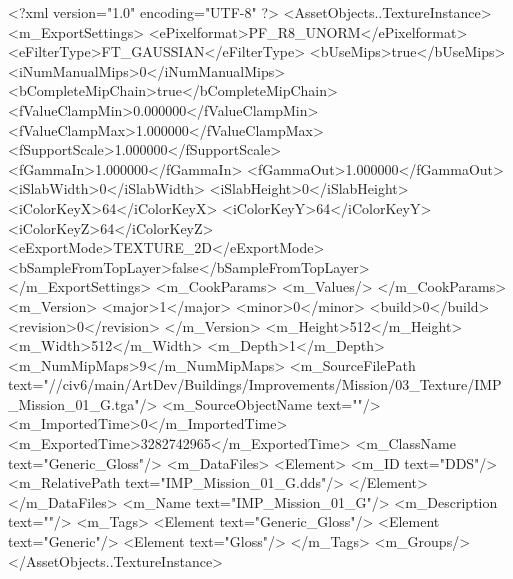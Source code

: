 <?xml version="1.0" encoding="UTF-8" ?>
<AssetObjects..TextureInstance>
	<m_ExportSettings>
		<ePixelformat>PF_R8_UNORM</ePixelformat>
		<eFilterType>FT_GAUSSIAN</eFilterType>
		<bUseMips>true</bUseMips>
		<iNumManualMips>0</iNumManualMips>
		<bCompleteMipChain>true</bCompleteMipChain>
		<fValueClampMin>0.000000</fValueClampMin>
		<fValueClampMax>1.000000</fValueClampMax>
		<fSupportScale>1.000000</fSupportScale>
		<fGammaIn>1.000000</fGammaIn>
		<fGammaOut>1.000000</fGammaOut>
		<iSlabWidth>0</iSlabWidth>
		<iSlabHeight>0</iSlabHeight>
		<iColorKeyX>64</iColorKeyX>
		<iColorKeyY>64</iColorKeyY>
		<iColorKeyZ>64</iColorKeyZ>
		<eExportMode>TEXTURE_2D</eExportMode>
		<bSampleFromTopLayer>false</bSampleFromTopLayer>
	</m_ExportSettings>
	<m_CookParams>
		<m_Values/>
	</m_CookParams>
	<m_Version>
		<major>1</major>
		<minor>0</minor>
		<build>0</build>
		<revision>0</revision>
	</m_Version>
	<m_Height>512</m_Height>
	<m_Width>512</m_Width>
	<m_Depth>1</m_Depth>
	<m_NumMipMaps>9</m_NumMipMaps>
	<m_SourceFilePath text="//civ6/main/ArtDev/Buildings/Improvements/Mission/03_Texture/IMP_Mission_01_G.tga"/>
	<m_SourceObjectName text=""/>
	<m_ImportedTime>0</m_ImportedTime>
	<m_ExportedTime>3282742965</m_ExportedTime>
	<m_ClassName text="Generic_Gloss"/>
	<m_DataFiles>
		<Element>
			<m_ID text="DDS"/>
			<m_RelativePath text="IMP_Mission_01_G.dds"/>
		</Element>
	</m_DataFiles>
	<m_Name text="IMP_Mission_01_G"/>
	<m_Description text=""/>
	<m_Tags>
		<Element text="Generic_Gloss"/>
		<Element text="Generic"/>
		<Element text="Gloss"/>
	</m_Tags>
	<m_Groups/>
</AssetObjects..TextureInstance>

